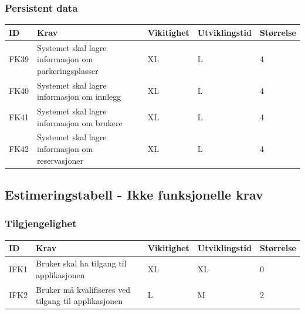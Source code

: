 \documentclass[12pt]{article}
\newcommand{\celly}{\cellcolor{yellow!25}}
\newcommand{\celll}{\cellcolor{lime!25}}
\begin{document}
        \subsubsection{Persistent data}

        \begin{tabular}{|p{2cm}|p{6cm}|
            >{\centering\arraybackslash}p{2cm}|
            >{\centering\arraybackslash}p{2cm}|
            >{\centering\arraybackslash}p{2cm}|} 
            \hline
            \bf ID & \bf Krav & \bf Vikitighet & \bf Utviklingstid & \bf Størrelse\\
            \hline
            FK39
            &
            Systemet skal lagre informasjon om parkeringsplasser
            & XL & L & \celly 4\\
            \hline
            FK40
            &
            Systemet skal lagre informasjon om innlegg
            & XL & L & \celly 4\\
            \hline
            FK41
            &
            Systemet skal lagre informasjon om brukere
            & XL & L & \celly 4\\
            \hline
            FK42
            &
            Systemet skal lagre informasjon om reservasjoner
            & XL & L & \celly 4\\
            \hline
        \end{tabular}

    \subsection{Estimeringstabell - Ikke funksjonelle krav}

        \subsubsection{Tilgjengelighet}

        \begin{tabular}{|p{2cm}|p{6cm}|
            >{\centering\arraybackslash}p{2cm}|
            >{\centering\arraybackslash}p{2cm}|
            >{\centering\arraybackslash}p{2cm}|}
            \hline
            \bf ID & \bf Krav & \bf Vikitighet & \bf Utviklingstid & \bf Størrelse\\
            \hline
            IFK1
            &
            Bruker skal ha tilgang til applikasjonen
            & XL & XL & \celly 0\\
            \hline
            IFK2
            &
            Bruker må kvalifiseres ved tilgang til applikasjonen
            & L & M & \celll 2\\
            \hline
        \end{tabular}
\end{document}
